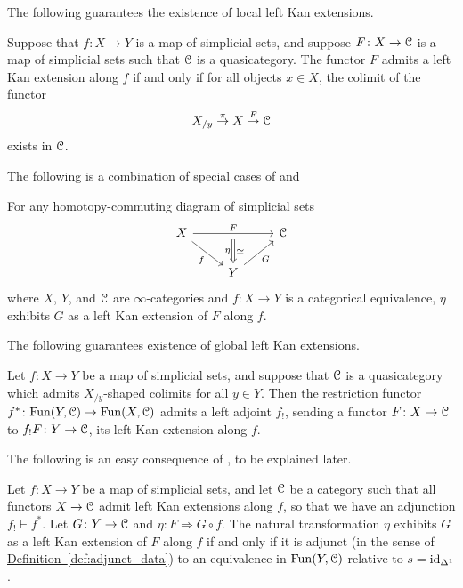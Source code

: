 \documentclass[main.tex]{subfiles}
\begin{document}
The following guarantees the existence of local left Kan extensions.
\begin{theorem}
  \label{thm:existence_local_left_kan_exts}
  Suppose that $f\colon X \to Y$ is a map of simplicial sets, and suppose $F\colon X \to \mathcal{C}$ is a map of simplicial sets such that $\mathcal{C}$ is a quasicategory. The functor $F$ admits a left Kan extension along $f$ if and only if for all objects $x \in X$, the colimit of the functor
  \begin{equation*}
    X_{/y} \overset{\pi}{\to} X \overset{F}{\to} \mathcal{C}
  \end{equation*}
  exists in $\mathcal{C}$.
\end{theorem}

The following is a combination of special cases of \cite[Proposition~7.3.1.15]{kerodon} and \cite[Corollary~7.3.1.16]{kerodon}
\begin{example}
  \label{eg:strictly_commuting_left_kan}
  For any homotopy-commuting diagram of simplicial sets
  \begin{equation*}
    \begin{tikzcd}
      X
      \arrow[dr, swap, "f"]
      \arrow[rr, "F", ""{below, name=M}]
      && \category{C}
      \\
      & Y
      \arrow[ur, swap, "G"]
      \arrow[from=M, Rightarrow, "\simeq", "\eta"{swap}]
    \end{tikzcd}
  \end{equation*}
  where $X$, $Y$, and $\mathcal{C}$ are $\infty$-categories and $f\colon X \to Y$ is a categorical equivalence, $\eta$ exhibits $G$ as a left Kan extension of $F$ along $f$.
\end{example}

The following guarantees existence of global left Kan extensions.
\begin{theorem}
  \label{thm:existence_global_left_kan_exts}
  Let $f\colon X \to Y$ be a map of simplicial sets, and suppose that $\mathcal{C}$ is a quasicategory which admits $X_{/y}$-shaped colimits for all $y \in Y$. Then the restriction functor $f^{*}\colon \mathrm{Fun}(Y, \mathcal{C}) \to \mathrm{Fun}(X, \mathcal{C})$ admits a left adjoint $f_{!}$, sending a functor $F\colon X \to \mathcal{C}$ to $f_{!}F\colon Y \to \mathcal{C}$, its left Kan extension along $f$.
\end{theorem}

The following is an easy consequence of \cite[Remark~7.3.1.11]{kerodon}, to be explained later.
\begin{proposition}
  Let $f\colon X \to Y$ be a map of simplicial sets, and let $\mathcal{C}$ be a category such that all functors $X \to \mathcal{C}$ admit left Kan extensions along $f$, so that we have an adjunction $f_{!} \vdash f^{*}$. Let $G\colon Y \to \mathcal{C}$ and $\eta\colon F \Rightarrow G \circ f$. The natural transformation $\eta$ exhibits $G$ as a left Kan extension of $F$ along $f$ if and only if it is adjunct (in the sense of \hyperref[def:adjunct_data]{Definition~\ref*{def:adjunct_data}}) to an equivalence in $\mathrm{Fun}(Y, \mathcal{C})$ relative to $s = \mathrm{id}_{\Delta^{1}}$.
\end{proposition}
\end{document}
